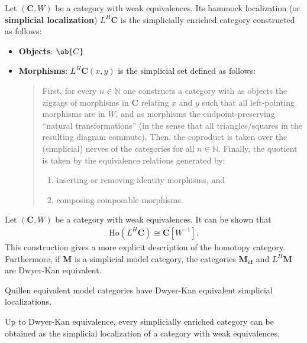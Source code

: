    \begin{construct}
        Let $(\mathbf{C},W)$ be a category with weak equivalences. Its hammock localization (or \textbf{simplicial localization}) $L^H\mathbf{C}$ is the simplicially enriched category constructed as follows:
        \begin{itemize}
            \item\textbf{Objects}: $\ob{C}$
            \item\textbf{Morphisms}: $L^H\mathbf{C}(x,y)$ is the simplicial set defined as follows:
            \begin{quote}
                First, for every $n\in\mathbb{N}$ one constructs a category with as objects the zigzags of morphisms in $\mathbf{C}$ relating $x$ and $y$ such that all left-pointing morphisms are in $W$, and as morphisms the endpoint-preserving ``natural transformations'' (in the sense that all triangles/squares in the resulting diagram commute). Then, the coproduct is taken over the (simplicial) nerves of the categories for all $n\in\mathbb{N}$. Finally, the quotient is taken by the equivalence relations generated by:
                \begin{enumerate}
                    \item inserting or removing identity morphisms, and
                    \item composing composable morphisms.
                \end{enumerate}
            \end{quote}
        \end{itemize}
    \end{construct}

    \begin{property}
        Let $(\mathbf{C},W)$ be a category with weak equivalences. It can be shown that
        \begin{gather}
            \mathrm{Ho}(L^H\mathbf{C})\cong\mathbf{C}[W^{-1}].
        \end{gather}
        This construction gives a more explicit description of the homotopy category. Furthermore, if $\mathbf{M}$ is a simplicial model category, the categories $\mathbf{M_{cf}}$ and $L^H\mathbf{M}$ are Dwyer-Kan equivalent.
    \end{property}
    \begin{property}
        Quillen equivalent model categories have Dwyer-Kan equivalent simplicial localizations.
    \end{property}
    \begin{property}
        Up to Dwyer-Kan equivalence, every simplicially enriched category can be obtained as the simplicial localization of a category with weak equivalences.
    \end{property}


